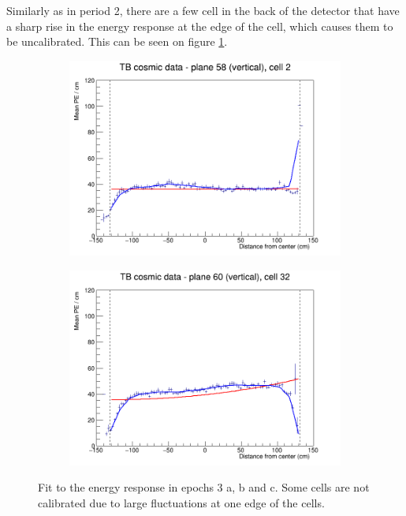 \documentclass[12pt,a4paper]{article}
\begin{document}
Similarly as in period 2, there are a few cell in the back of the detector that have a sharp rise in the energy response at the edge of the cell, which causes them to be uncalibrated. This can be seen on figure \ref{figAttenfitResultsEpoch3abc_CellEdges}.

\begin{figure}[h]
  \begin{subfigure}{0.5\textwidth}
    \includegraphics[width=\linewidth]{RelativeCalibrationResults/ep3abc_058_002.png}
  \end{subfigure}
  \begin{subfigure}{0.5\textwidth}
    \includegraphics[width=\linewidth]{RelativeCalibrationResults/ep3abc_060_032.png}
  \end{subfigure}
  \caption{Fit to the energy response in epochs 3 a, b and c. Some cells are not calibrated due to large fluctuations at one edge of the cells.}
  \label{figAttenfitResultsEpoch3abc_CellEdges}
\end{figure}
\end{document}
